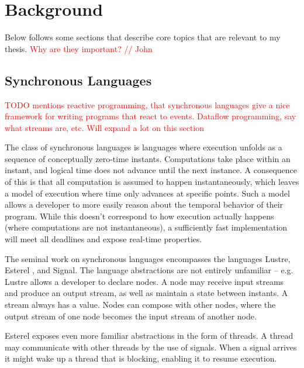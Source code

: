 
\section{Background}

Below follows some sections that describe core topics that are relevant to my thesis.
\textcolor{red}{Why are they important? // John}

\subsection{Synchronous Languages}

\textcolor{red}{
TODO mentions reactive programming, that synchronous languages give a nice framework for writing programs that
react to events. Dataflow programming, say what streams are, etc. Will expand a lot on this section}

The class of synchronous languages is languages where execution unfolds as a sequence of conceptually zero-time instants. Computations
take place within an instant, and logical time does not advance until the next instance. A consequence of this is that all
computation is assumed to happen instantaneously, which leaves a model of execution where time only advances at specific
points. Such a model allows a developer to more easily reason about the temporal behavior of their program.
While this doesn't correspond to how execution actually happens (where computations are not instantaneous), a sufficiently
fast implementation will meet all deadlines and expose real-time properties.

The seminal work on synchronous languages encompasses the languages Lustre\cite{DBLP:conf/popl/CaspiPHP87}, Esterel
\cite{DBLP:journals/scp/BerryG92}, and Signal\cite{DBLP:journals/scp/BenvenisteGJ91}. The language abstractions
are not entirely unfamiliar -- e.g. Lustre allows a developer to declare nodes. A node may receive input streams and produce
an output stream, as well as maintain a state between instants. A stream always has a value. Nodes can compose with other
nodes, where the output stream of one node becomes the input stream of another node.

Esterel exposes even more familiar abstractions in the form of threads. A thread may communicate with other threads by the
use of signals. When a signal arrives it might wake up a thread that is blocking, enabling it to resume execution.

